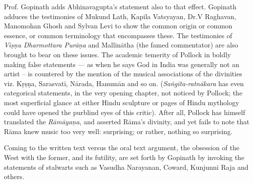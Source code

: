 Prof. Gopinath adds Abhinavagupta’s statement also to that effect. Gopinath adduces the testimonies of Mukund Lath, Kapila Vatsyayan, Dr.\@ V Raghavan, Manomohan Ghosh and Sylvan Levi to show the common origin or common essence, or common terminology that encompasses these. The testimonies of \textsl{Viṣṇu Dharmottara Purāṇa} and Mallinātha (the famed commentator) are also brought to bear on these issues. The academic temerity of Pollock in boldly making false statements --- as when he says God in India was generally not an artist -- is countered by the mention of the musical associations of the divinities viz. Kṛṣṇa, Sarasvatī, Nārada, Hanumān and so on. (\textsl{Saṅgīta-ratnākara} has even categorical statements, in the very opening chapter, not noticed by Pollock; the most superficial glance at either Hindu sculpture or pages of Hindu mythology could have opened the purblind eyes of this critic). After all, Pollock has himself translated the \textsl{Rāmāyaṇa}, and asserted Rāma’s divinity, and yet fails to note that Rāma knew music too very well: surprising; or rather, nothing so surprising.

Coming to the written text versus the oral text argument, the obsession of the West with the former, and its futility, are set forth by Gopinath by invoking the statements of stalwarts such as Vasudha Narayanan, Coward, Kunjunni Raja and others.

